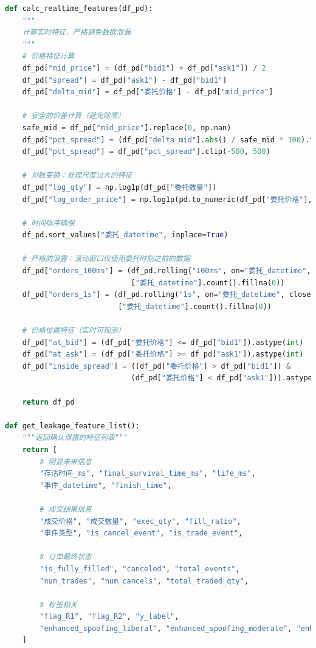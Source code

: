 \documentclass[12pt,a4paper]{article}
\begin{document}
\begin{lstlisting}[language=Python, caption=防泄漏特征工程核心代码]
def calc_realtime_features(df_pd):
    """
    计算实时特征，严格避免数据泄漏
    """
    # 价格特征计算
    df_pd["mid_price"] = (df_pd["bid1"] + df_pd["ask1"]) / 2
    df_pd["spread"] = df_pd["ask1"] - df_pd["bid1"]
    df_pd["delta_mid"] = df_pd["委托价格"] - df_pd["mid_price"]
    
    # 安全的价差计算（避免除零）
    safe_mid = df_pd["mid_price"].replace(0, np.nan)
    df_pd["pct_spread"] = (df_pd["delta_mid"].abs() / safe_mid * 100).fillna(0)
    df_pd["pct_spread"] = df_pd["pct_spread"].clip(-500, 500)
    
    # 对数变换：处理尺度过大的特征
    df_pd["log_qty"] = np.log1p(df_pd["委托数量"])
    df_pd["log_order_price"] = np.log1p(pd.to_numeric(df_pd["委托价格"], errors='coerce').fillna(0))
    
    # 时间排序确保
    df_pd.sort_values("委托_datetime", inplace=True)
    
    # 严格防泄露：滚动窗口仅使用委托时刻之前的数据
    df_pd["orders_100ms"] = (df_pd.rolling("100ms", on="委托_datetime", closed='left')
                             ["委托_datetime"].count().fillna(0))
    df_pd["orders_1s"] = (df_pd.rolling("1s", on="委托_datetime", closed='left')
                          ["委托_datetime"].count().fillna(0))
    
    # 价格位置特征（实时可观测）
    df_pd["at_bid"] = (df_pd["委托价格"] <= df_pd["bid1"]).astype(int)
    df_pd["at_ask"] = (df_pd["委托价格"] >= df_pd["ask1"]).astype(int)
    df_pd["inside_spread"] = ((df_pd["委托价格"] > df_pd["bid1"]) & 
                             (df_pd["委托价格"] < df_pd["ask1"])).astype(int)
    
    return df_pd

def get_leakage_feature_list():
    """返回确认泄露的特征列表"""
    return [
        # 明显未来信息
        "存活时间_ms", "final_survival_time_ms", "life_ms",
        "事件_datetime", "finish_time",
        
        # 成交结果信息
        "成交价格", "成交数量", "exec_qty", "fill_ratio",
        "事件类型", "is_cancel_event", "is_trade_event",
        
        # 订单最终状态
        "is_fully_filled", "canceled", "total_events",
        "num_trades", "num_cancels", "total_traded_qty",
        
        # 标签相关
        "flag_R1", "flag_R2", "y_label",
        "enhanced_spoofing_liberal", "enhanced_spoofing_moderate", "enhanced_spoofing_strict"
    ]
\end{lstlisting}
\end{document}
